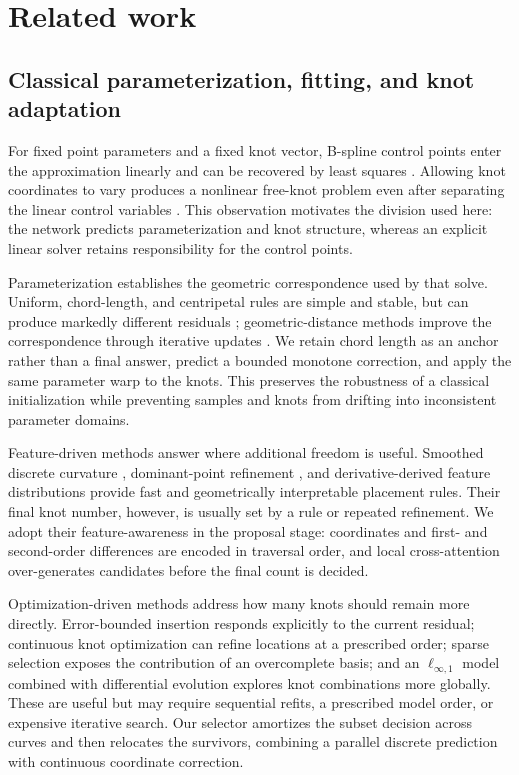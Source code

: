 \documentclass[preprint,12pt]{elsarticle}
\begin{document}
\section{Related work}
\subsection{Classical parameterization, fitting, and knot adaptation}
For fixed point parameters and a fixed knot vector, B-spline control points
enter the approximation linearly and can be recovered by least squares
\cite{piegl1997,yeh2020}. Allowing knot coordinates to vary produces a
nonlinear free-knot problem even after separating the linear control variables
\cite{jupp1978}. This observation motivates the division used here: the
network predicts parameterization and knot structure, whereas an explicit
linear solver retains responsibility for the control points.

Parameterization establishes the geometric correspondence used by that solve.
Uniform, chord-length, and centripetal rules are simple and stable, but can
produce markedly different residuals \cite{lee1989}; geometric-distance
methods improve the correspondence through iterative updates \cite{wang2006}.
We retain chord length as an anchor rather than a final answer, predict a
bounded monotone correction, and apply the same parameter warp to the knots.
This preserves the robustness of a classical initialization while preventing
samples and knots from drifting into inconsistent parameter domains.

Feature-driven methods answer where additional freedom is useful. Smoothed
discrete curvature \cite{li2005}, dominant-point refinement \cite{park2007},
and derivative-derived feature distributions \cite{yeh2020} provide fast and
geometrically interpretable placement rules. Their final knot number,
however, is usually set by a rule or repeated refinement. We adopt their
feature-awareness in the proposal stage: coordinates and first- and
second-order differences are encoded in traversal order, and local
cross-attention over-generates candidates before the final count is decided.

Optimization-driven methods address how many knots should remain more
directly. Error-bounded insertion \cite{liang2017} responds explicitly to the
current residual; continuous knot optimization \cite{dung2017} can refine
locations at a prescribed order; sparse selection \cite{kang2015} exposes the
contribution of an overcomplete basis; and an $\ell_{\infty,1}$ model combined
with differential evolution \cite{luo2022} explores knot combinations more
globally. These are useful but may require sequential refits, a prescribed
model order, or expensive iterative search. Our selector amortizes the subset
decision across curves and then relocates the survivors, combining a parallel
discrete prediction with continuous coordinate correction.
\end{document}
